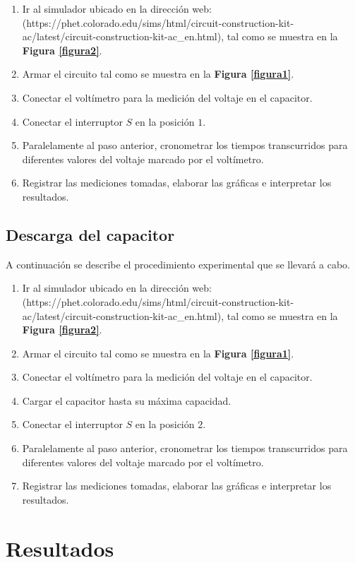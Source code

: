 \documentclass[letter,11pt]{article}
\begin{document}
\begin{enumerate}
\item Ir al simulador ubicado en la dirección web:
(https://phet.colorado.edu/sims/html/circuit-construction-kit-ac/latest/circuit-construction-kit-ac\_en.html),
tal como se muestra en la \textbf{Figura \ref{figura2}}.
\item Armar el circuito tal como se muestra en la \textbf{Figura \ref{figura1}}.
\item Conectar el voltímetro para la medición del voltaje en el capacitor.
\item Conectar el interruptor $S$ en la posición $1$.
\item Paralelamente al paso anterior, cronometrar los tiempos transcurridos para
    diferentes valores del voltaje marcado por el voltímetro.
\item Registrar las mediciones tomadas, elaborar las gráficas e interpretar los
    resultados.
\end{enumerate}

\subsection{Descarga del capacitor}
A continuación se describe el procedimiento experimental que se llevará a cabo.

\begin{enumerate}
\item Ir al simulador ubicado en la dirección web:
(https://phet.colorado.edu/sims/html/circuit-construction-kit-ac/latest/circuit-construction-kit-ac\_en.html),
tal como se muestra en la \textbf{Figura \ref{figura2}}.
\item Armar el circuito tal como se muestra en la \textbf{Figura \ref{figura1}}.
\item Conectar el voltímetro para la medición del voltaje en el capacitor.
\item Cargar el capacitor hasta su máxima capacidad.
\item Conectar el interruptor $S$ en la posición $2$.
\item Paralelamente al paso anterior, cronometrar los tiempos transcurridos para
    diferentes valores del voltaje marcado por el voltímetro.
\item Registrar las mediciones tomadas, elaborar las gráficas e interpretar los
    resultados.
\end{enumerate}

\section{Resultados}
\end{document}
